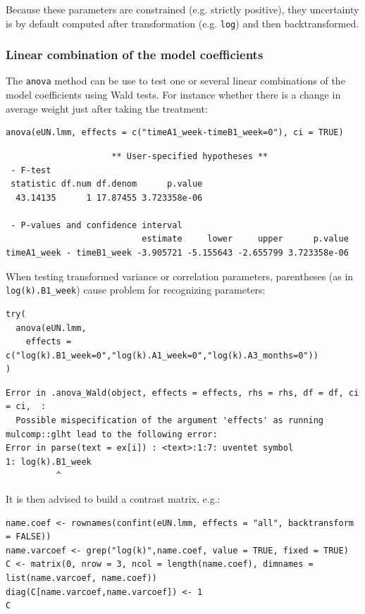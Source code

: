 \documentclass[12pt]{article}
\begin{document}
Because these parameters are constrained (e.g. strictly positive),
they uncertainty is by default computed after transformation
(e.g. \texttt{log}) and then backtransformed. 

\subsubsection{Linear combination of the model coefficients}
\label{sec:org73dea99}

The \texttt{anova} method can be use to test one or several linear
combinations of the model coefficients using Wald tests. For instance
whether there is a change in average weight just after taking the
treatment:
\lstset{language=r,label= ,caption= ,captionpos=b,numbers=none}
\begin{lstlisting}
anova(eUN.lmm, effects = c("timeA1_week-timeB1_week=0"), ci = TRUE)
\end{lstlisting}

\begin{verbatim}
                     ** User-specified hypotheses ** 
 - F-test
 statistic df.num df.denom      p.value
  43.14135      1 17.87455 3.723358e-06

 - P-values and confidence interval 
                           estimate     lower     upper      p.value
timeA1_week - timeB1_week -3.905721 -5.155643 -2.655799 3.723358e-06
\end{verbatim}


When testing transformed variance or correlation parameters,
parentheses (as in \texttt{log(k).B1\_week}) cause problem for recognizing
parameters:
\lstset{language=r,label= ,caption= ,captionpos=b,numbers=none}
\begin{lstlisting}
try(
  anova(eUN.lmm,
	effects = c("log(k).B1_week=0","log(k).A1_week=0","log(k).A3_months=0"))
)
\end{lstlisting}

\begin{verbatim}
Error in .anova_Wald(object, effects = effects, rhs = rhs, df = df, ci = ci,  : 
  Possible mispecification of the argument 'effects' as running mulcomp::glht lead to the following error: 
Error in parse(text = ex[i]) : <text>:1:7: uventet symbol
1: log(k).B1_week
          ^
\end{verbatim}


\clearpage

It is then advised to build a contrast matrix, e.g.:
\lstset{language=r,label= ,caption= ,captionpos=b,numbers=none}
\begin{lstlisting}
name.coef <- rownames(confint(eUN.lmm, effects = "all", backtransform = FALSE))
name.varcoef <- grep("log(k)",name.coef, value = TRUE, fixed = TRUE)
C <- matrix(0, nrow = 3, ncol = length(name.coef), dimnames = list(name.varcoef, name.coef))
diag(C[name.varcoef,name.varcoef]) <- 1
C
\end{lstlisting}
\end{document}
